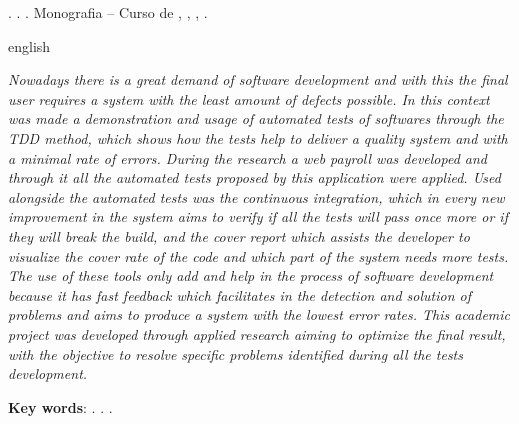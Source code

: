






\begin{OnehalfSpacing} 

\noindent \imprimirAutorCitacaoMaiuscula. {\bfseries\imprimirtitulo}. {\imprimirdata}.  Monografia -- Curso de {\MakeUppercase\imprimircurso}, {\imprimirinstituicao}, {\imprimirlocal}, {\imprimirdata}.

\vspace{\onelineskip}
\vspace{\onelineskip}
\vspace{\onelineskip}
\vspace{\onelineskip}

\begin{resumo}%
\begin{otherlanguage*}{english}%



\par \textit{Nowadays there is a great demand of software development and with this the final user requires a system with the least amount of defects possible. In this context was made a demonstration and usage of automated tests of softwares through the TDD method, which shows how the tests help to deliver a quality system and with a minimal rate of errors. During the research a web payroll was developed and through it all the automated tests proposed by this application
were applied. Used alongside the automated tests was the continuous
integration, which in every new improvement in the system aims to verify if all the tests will pass once more or if they will break the build, and the cover report which assists the developer to visualize the cover rate of the code and which part of the system needs more tests. The use of these tools only add and help in the process of software development because it has fast feedback which facilitates in the detection and solution of problems and aims to produce a system with the lowest error rates. This academic project was developed through applied research aiming to optimize the final result, with the objective to resolve specific problems identified during all the tests development.}

\vspace{\onelineskip}
\vspace*{\fill}
\noindent \textbf{Key words}: \imprimirKeyWordOne. \imprimirKeyWordTwo. \imprimirKeyWordThree.
\end{otherlanguage*}
\vspace{\onelineskip}
\end{resumo}

\end{OnehalfSpacing}


